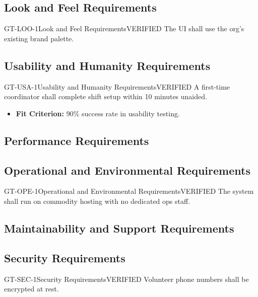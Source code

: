 \documentclass[11pt,a4paper]{article}
\begin{document}
\subsection{Look and Feel Requirements}
\begin{requirementbox}{GT-LOO-1}{Look and Feel Requirements}{VERIFIED}
The UI shall use the org's existing brand palette.
\end{requirementbox}

\subsection{Usability and Humanity Requirements}
\begin{requirementbox}{GT-USA-1}{Usability and Humanity Requirements}{VERIFIED}
A first-time coordinator shall complete shift setup within 10 minutes unaided.
\begin{itemize}[leftmargin=*,itemsep=2pt,topsep=4pt]
    \item \textbf{Fit Criterion:} 90\% success rate in usability testing.
\end{itemize}
\end{requirementbox}

\subsection{Performance Requirements}
\subsection{Operational and Environmental Requirements}
\begin{requirementbox}{GT-OPE-1}{Operational and Environmental Requirements}{VERIFIED}
The system shall run on commodity hosting with no dedicated ops staff.
\end{requirementbox}

\subsection{Maintainability and Support Requirements}
\subsection{Security Requirements}
\begin{requirementbox}{GT-SEC-1}{Security Requirements}{VERIFIED}
Volunteer phone numbers shall be encrypted at rest.
\end{requirementbox}
\end{document}
